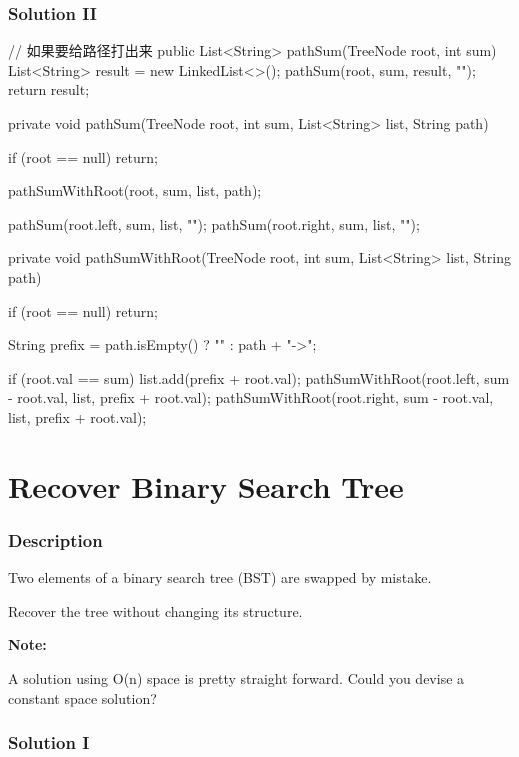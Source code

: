 \newpage

\subsubsection{Solution II}
\begin{Code}
// 如果要给路径打出来
public List<String> pathSum(TreeNode root, int sum) {
    List<String> result = new LinkedList<>();
    pathSum(root, sum, result, "");
    return result;
}

private void pathSum(TreeNode root, int sum, List<String> list, String path) {
    if (root == null) {
        return;
    }

    pathSumWithRoot(root, sum, list, path);

    pathSum(root.left, sum, list, "");
    pathSum(root.right, sum, list, "");
}

private void pathSumWithRoot(TreeNode root, int sum, List<String> list, String path) {
    if (root == null) {
        return;
    }

    String prefix = path.isEmpty() ? "" : path + "->";

    if (root.val == sum) {
        list.add(prefix + root.val);
    }
    pathSumWithRoot(root.left, sum - root.val, list, prefix + root.val);
    pathSumWithRoot(root.right, sum - root.val, list, prefix + root.val);
}
\end{Code}

\newpage

\section{Recover Binary Search Tree} %

\subsubsection{Description}
Two elements of a binary search tree (BST) are swapped by mistake.

Recover the tree without changing its structure.

\textbf{Note:}

A solution using O(n) space is pretty straight forward. Could you devise a constant space solution?

\subsubsection{Solution I}

